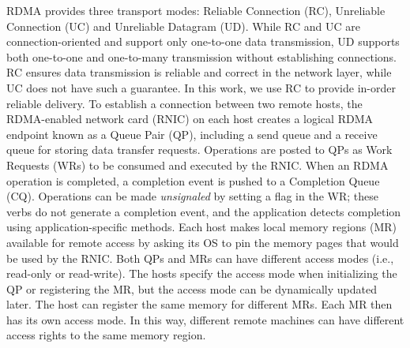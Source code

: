 RDMA provides three transport modes: Reliable Connection (RC), Unreliable Connection (UC) and Unreliable Datagram (UD). 
While RC and UC are connection-oriented and support only one-to-one data transmission, UD supports both one-to-one and one-to-many transmission without establishing connections.
RC ensures data transmission is reliable and correct in the network layer, while UC does not have such a guarantee.
In this work, we use RC to provide in-order reliable delivery.
To establish a connection between two remote hosts, the RDMA-enabled network card (RNIC) on each host creates a logical RDMA endpoint known as a Queue Pair (QP), including a send queue and a receive queue for storing data transfer requests. 
Operations are posted to QPs as Work Requests (WRs) to be consumed and executed by the RNIC. 
When an RDMA operation is completed, a completion event is pushed to a Completion Queue (CQ).
Operations can be made \emph{unsignaled} by setting a flag in the WR; these verbs do not generate a completion event, and the application detects completion using application-specific methods.
Each host makes local memory regions (MR) available for remote access by asking its OS to pin the memory pages that would be used by the RNIC.
Both QPs and MRs can have different access modes (i.e., read-only or read-write). 
The hosts specify the access mode when initializing the QP or registering the MR, but the access mode can be dynamically updated later. 
The host can register the same memory for different MRs. Each MR then has its own access mode.
In this way, different remote machines can have different access rights to the same memory region. 
